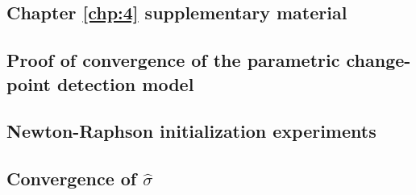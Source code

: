 \begin{appendices}
\chapter{Chapter \ref{chp:4} supplementary material} \label{app:chap4}

\section{Proof of convergence of the parametric change-point detection model}\label{app:chap4:1}

\section{Newton-Raphson initialization experiments}\label{app:chap4:2}

\section{Convergence of \texorpdfstring{$\hat\sigma$}{s}}\label{app:chap4:3}

\end{appendices}